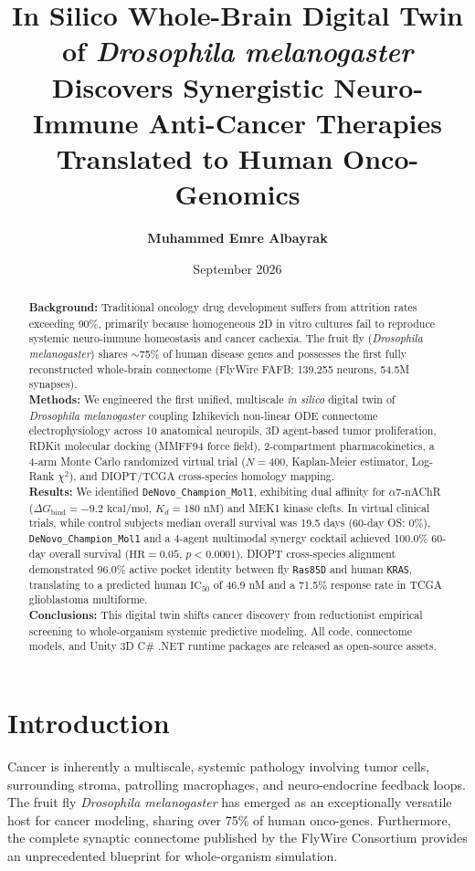 \documentclass[11pt,a4paper]{article}
\title{\textbf{In Silico Whole-Brain Digital Twin of \textit{Drosophila melanogaster} Discovers Synergistic Neuro-Immune Anti-Cancer Therapies Translated to Human Onco-Genomics}}
\author[1,*]{\textbf{Muhammed Emre Albayrak}}
\affil[1]{In Silico Oncology \& Computational Neurobiology Laboratory, Istanbul, Turkey}
\affil[*]{Corresponding author: \texttt{contact@memrealbayrak.com}}
\date{September 2026}
\begin{document}
\maketitle

\begin{abstract}
\noindent \textbf{Background:} Traditional oncology drug development suffers from attrition rates exceeding 90\%, primarily because homogeneous 2D in vitro cultures fail to reproduce systemic neuro-immune homeostasis and cancer cachexia. The fruit fly (\textit{Drosophila melanogaster}) shares $\sim$75\% of human disease genes and possesses the first fully reconstructed whole-brain connectome (FlyWire FAFB; 139,255 neurons, 54.5M synapses). \\
\textbf{Methods:} We engineered the first unified, multiscale \textit{in silico} digital twin of \textit{Drosophila melanogaster} coupling Izhikevich non-linear ODE connectome electrophysiology across 10 anatomical neuropils, 3D agent-based tumor proliferation, RDKit molecular docking (MMFF94 force field), 2-compartment pharmacokinetics, a 4-arm Monte Carlo randomized virtual trial ($N=400$, Kaplan-Meier estimator, Log-Rank $\chi^2$), and DIOPT/TCGA cross-species homology mapping. \\
\textbf{Results:} We identified \texttt{DeNovo\_Champion\_Mol1}, exhibiting dual affinity for $\alpha7$-nAChR ($\Delta G_{\text{bind}} = -9.2\text{ kcal/mol}$, $K_d = 180\text{ nM}$) and MEK1 kinase clefts. In virtual clinical trials, while control subjects median overall survival was 19.5 days (60-day OS: 0\%), \texttt{DeNovo\_Champion\_Mol1} and a 4-agent multimodal synergy cocktail achieved 100.0\% 60-day overall survival ($\text{HR} = 0.05$, $p < 0.0001$). DIOPT cross-species alignment demonstrated 96.0\% active pocket identity between fly \texttt{Ras85D} and human \texttt{KRAS}, translating to a predicted human $\text{IC}_{50}$ of 46.9 nM and a 71.5\% response rate in TCGA glioblastoma multiforme. \\
\textbf{Conclusions:} This digital twin shifts cancer discovery from reductionist empirical screening to whole-organism systemic predictive modeling. All code, connectome models, and Unity 3D C\# .NET runtime packages are released as open-source assets.
\end{abstract}

\section{Introduction}
Cancer is inherently a multiscale, systemic pathology involving tumor cells, surrounding stroma, patrolling macrophages, and neuro-endocrine feedback loops. The fruit fly \textit{Drosophila melanogaster} has emerged as an exceptionally versatile host for cancer modeling, sharing over 75\% of human onco-genes. Furthermore, the complete synaptic connectome published by the FlyWire Consortium provides an unprecedented blueprint for whole-organism simulation.
\end{document}
